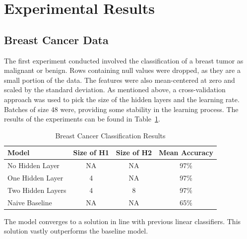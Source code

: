 \documentclass{amsart}
\begin{document}
    \section{Experimental Results}
    \subsection*{Breast Cancer Data}
    The first experiment conducted involved the classification of a breast tumor
    as malignant or benign\cite{cancerdataset}. Rows containing null values were dropped,
    as they are a small portion of the
    data. The features were also mean-centered at zero and scaled by the standard deviation.
    As mentioned above, a cross-validation approach was used to pick the size of the hidden layers and
    the learning rate. Batches of size 48 were, providing some stability in the learning process.
    The results of the experiments can be found in Table~\ref{breast_results}.
    \begin{table}[H]
    \begin{tabular}{lccc}
    Model & Size of H1 & Size of H2 & Mean Accuracy \\
    \hline
    No Hidden Layer & NA & NA & 97\%\\
    One Hidden Layer & 4 & NA & 97\% \\
    Two Hidden Layers & 4 & 8 & 97\% \\
    Naive Baseline & NA & NA & 65\%
    \end{tabular}
    \label{breast_results}
    \caption{Breast Cancer Classification Results}
    \end{table}
    The model converges to a solution in line with previous linear
    classifiers. This solution vastly outperforms the baseline model.
\end{document}

